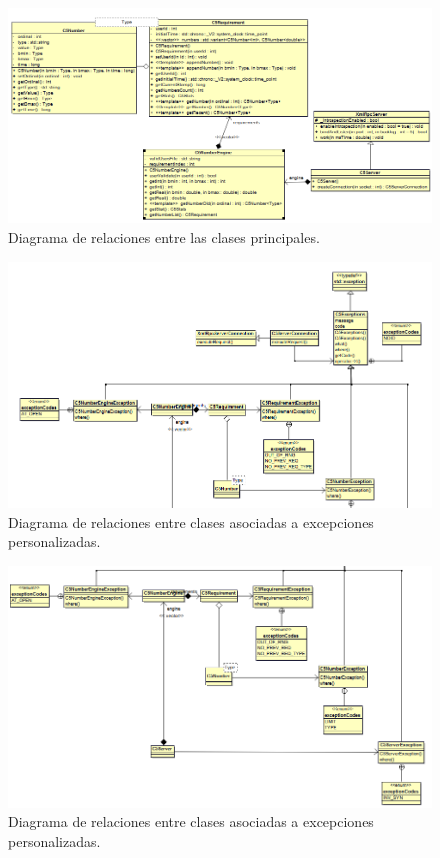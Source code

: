 \documentclass[a4paper,12pt]{article}
\begin{document}
\begin{figure}[htbp]
    \centering
    \includegraphics[width=\textwidth]{C5/Esquema_general_C5_server_consigna.PNG}
    \caption{Diagrama de relaciones entre las clases principales.}
    \label{fig:relaciones_principales}
\end{figure}

\begin{figure}[htbp]
    \centering
    \includegraphics[width=\textwidth]{C5/Esquema_general_C5_server_excepciones_1.PNG}
    \caption{Diagrama de relaciones entre clases asociadas a excepciones personalizadas.}
    \label{fig:excepciones_personalizadas1}
\end{figure}

\begin{figure}[htbp]
    \centering
    \includegraphics[width=\textwidth]{C5/Esquema_general_C5_server_excepciones_2.PNG}
    \caption{Diagrama de relaciones entre clases asociadas a excepciones personalizadas.}
    \label{fig:excepciones_personalizadas2}
\end{figure}
\end{document}
